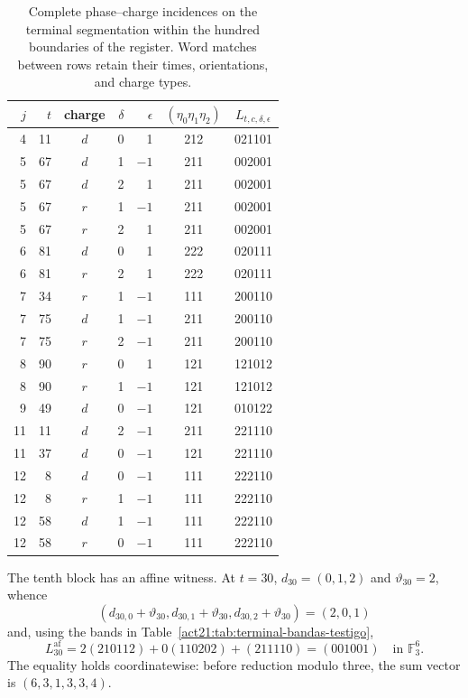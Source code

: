 \begin{table}[htbp]
\centering\small
\begin{tabular}{rrcrrc c}
\toprule
$j$&$t$&charge&$\delta$&$\epsilon$&$(\eta_0\eta_1\eta_2)$&$L_{t,c,\delta,\epsilon}$\\
\midrule
4&11&$d$&0& 1&212&021101\\
5&67&$d$&1&$-1$&211&002001\\
5&67&$d$&2& 1&211&002001\\
5&67&$r$&1&$-1$&211&002001\\
5&67&$r$&2& 1&211&002001\\
6&81&$d$&0& 1&222&020111\\
6&81&$r$&2& 1&222&020111\\
7&34&$r$&1&$-1$&111&200110\\
7&75&$d$&1&$-1$&211&200110\\
7&75&$r$&2&$-1$&211&200110\\
8&90&$r$&0& 1&121&121012\\
8&90&$r$&1&$-1$&121&121012\\
9&49&$d$&0&$-1$&121&010122\\
11&11&$d$&2&$-1$&211&221110\\
11&37&$d$&0&$-1$&121&221110\\
12&8&$d$&0&$-1$&111&222110\\
12&8&$r$&1&$-1$&111&222110\\
12&58&$d$&1&$-1$&111&222110\\
12&58&$r$&0&$-1$&111&222110\\
\bottomrule
\end{tabular}
\caption{Complete phase--charge incidences on the terminal segmentation
within the hundred boundaries of the register. Word matches between
rows retain their times, orientations, and charge types.}
\label{act21:tab:terminal-incidencias-completas}
\end{table}

The tenth block has an affine witness. At $t=30$,
$d_{30}=(0,1,2)$ and $\vartheta_{30}=2$, whence
\[
 (d_{30,0}+\vartheta_{30},d_{30,1}+\vartheta_{30},
 d_{30,2}+\vartheta_{30})=(2,0,1)
\]
and, using the bands in Table~\ref{act21:tab:terminal-bandas-testigo},
\[
 L^{\mathrm{af}}_{30}
 =2(210112)+0(110202)+(211110)
 =(001001)\quad\text{in }\mathbb F_3^6.
\]
The equality holds coordinatewise: before reduction modulo three,
the sum vector is $(6,3,1,3,3,4)$.

